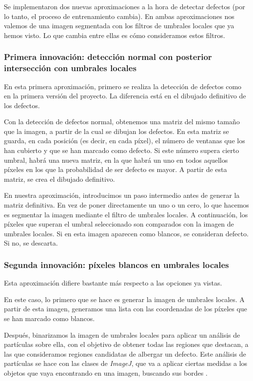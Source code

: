 Se implementaron dos nuevas aproximaciones a la hora de detectar defectos (por lo tanto, el proceso de entrenamiento cambia). En ambas aproximaciones nos valemos de una imagen segmentada con los filtros de umbrales locales que ya hemos visto. Lo que cambia entre ellas es cómo consideramos estos filtros.

\subsubsection{Primera innovación: detección normal con posterior intersección con umbrales locales}
En esta primera aproximación, primero se realiza la detección de defectos como en la primera versión del proyecto. La diferencia está en el dibujado definitivo de los defectos.

Con la detección de defectos normal, obtenemos una matriz del mismo tamaño que la imagen, a partir de la cual se dibujan los defectos. En esta matriz se guarda, en cada posición (es decir, en cada píxel), el número de ventanas que los han cubierto y que se han marcado como defecto. Si este número supera cierto umbral, habrá una nueva matriz, en la que habrá un uno en todos aquellos píxeles en los que la probabilidad de ser defecto es mayor. A partir de esta matriz, se crea el dibujado definitivo.

En nuestra aproximación, introducimos un paso intermedio antes de generar la matriz definitiva. En vez de poner directamente un uno o un cero, lo que hacemos es segmentar la imagen mediante el filtro de umbrales locales. A continuación, los píxeles que superan el umbral seleccionado son comparados con la imagen de umbrales locales. Si en esta imagen aparecen como blancos, se consideran defecto. Si no, se descarta.

\subsubsection{Segunda innovación: píxeles blancos en umbrales locales}
Esta aproximación difiere bastante más respecto a las opciones ya vistas.

En este caso, lo primero que se hace es generar la imagen de umbrales locales. A partir de esta imagen, generamos una lista con las coordenadas de los píxeles que se han marcado como blancos.

Después, binarizamos la imagen de umbrales locales para aplicar un análisis de partículas sobre ella, con el objetivo de obtener todas las regiones que destacan, a las que consideramos regiones candidatas de albergar un defecto. Este análisis de partículas se hace con las clases de \emph{ImageJ}, que va a aplicar ciertas medidas a los objetos que vaya encontrando en una imagen, buscando sus bordes \cite{particleij}.

